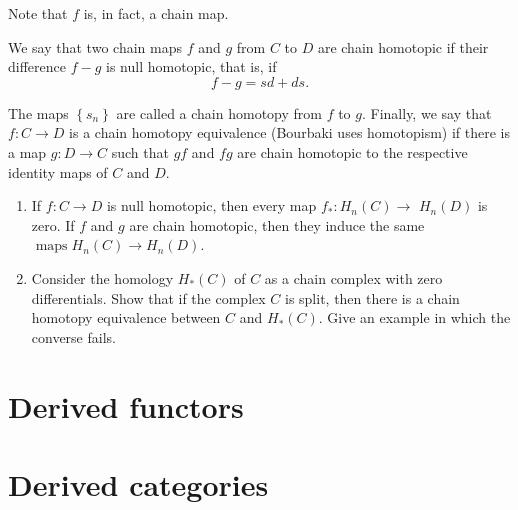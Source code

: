      Note that $f$ is, in fact, a chain map.

We say that two chain maps $f$ and $g$ from $C$ to $D$ are chain homotopic if their difference $f-g$ is null homotopic, that is, if
      $$
      f-g=s d+d s .
      $$
      
      The maps $\left\{s_n\right\}$ are called a chain homotopy from $f$ to $g$. Finally, we say that $f: C \rightarrow D$ is a chain homotopy equivalence (Bourbaki uses homotopism) if there is a map $g: D \rightarrow C$ such that $g f$ and $f g$ are chain homotopic to the respective identity maps of $C$ and $D$.

\begin{prop}
    \begin{enumerate}
        \item If $f: C \rightarrow D$ is null homotopic, then every map $f_*: H_n(C) \rightarrow$ $H_n(D)$ is zero. If $f$ and $g$ are chain homotopic, then they induce the same $\operatorname{maps} H_n(C) \rightarrow H_n(D)$.
        \item Consider the homology $H_*(C)$ of $C$ as a chain complex with zero differentials. Show that if the complex $C$ is split, then there is a chain homotopy equivalence between $C$ and $H_*(C)$. Give an example in which the converse fails.

    \end{enumerate}
\end{prop}




\section{Derived functors}




\section{Derived categories}








